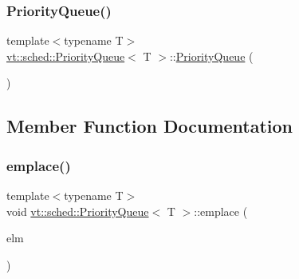 \mbox{\label{structvt_1_1sched_1_1_priority_queue_a25eedffc3b4665d0c1bb27027803e571}} 
\subsubsection{\texorpdfstring{Priority\+Queue()}{PriorityQueue()}\hspace{0.1cm}{\footnotesize\ttfamily [3/3]}}
{\footnotesize\ttfamily template$<$typename T$>$ \\
\hyperlink{structvt_1_1sched_1_1_priority_queue}{vt\+::sched\+::\+Priority\+Queue}$<$ T $>$\+::\hyperlink{structvt_1_1sched_1_1_priority_queue}{Priority\+Queue} (\begin{DoxyParamCaption}\item[{\hyperlink{structvt_1_1sched_1_1_priority_queue}{Priority\+Queue}$<$ T $>$ \&\&}]{ }\end{DoxyParamCaption})\hspace{0.3cm}{\ttfamily [default]}}



\subsection{Member Function Documentation}
\mbox{\label{structvt_1_1sched_1_1_priority_queue_a152f4592447d7c478fe6aa0f8fbd5173}} 
\subsubsection{\texorpdfstring{emplace()}{emplace()}}
{\footnotesize\ttfamily template$<$typename T$>$ \\
void \hyperlink{structvt_1_1sched_1_1_priority_queue}{vt\+::sched\+::\+Priority\+Queue}$<$ T $>$\+::emplace (\begin{DoxyParamCaption}\item[{T \&\&}]{elm }\end{DoxyParamCaption})\hspace{0.3cm}{\ttfamily [inline]}}


